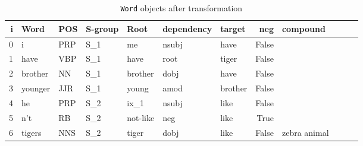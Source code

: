\documentclass[12pt]{ociamthesis}  %
\begin{document}
\begin{table}[ht]
\center
\small
\begin{tabular}{rlll>{\columncolor[RGB]{204, 230, 255}}lllrlrrl}
\hline
   i & Word    & POS   & S-group  & \textbf{Root}   &   dependency & target   &  neg &  compound   \\
\hline
   0 & i       & PRP   & S\_1   & me       & nsubj &  have     &      False &          \\
   1 & have    & VBP   & S\_1   & have     & root  &  tiger    &      False &          \\
   2 & brother & NN    & S\_1   & brother  & dobj  &  have     &      False &          \\
   3 & younger & JJR   & S\_1   & young    & amod  &  brother  &      False &          \\
   4 & he      & PRP   & S\_2   & ix\_1     & nsubj &  like     &     False &          \\
   5 & n't     & RB    & S\_2   & not-like & neg   &   like     &      True &           \\
   6 & tigers  & NNS   & S\_2   & tiger    & dobj  &  like     &      False &   zebra animal    \\
\hline
\end{tabular}
\caption{\texttt{Word} objects after transformation}
\label{table:inter-word}
\end{table}
\end{document}
